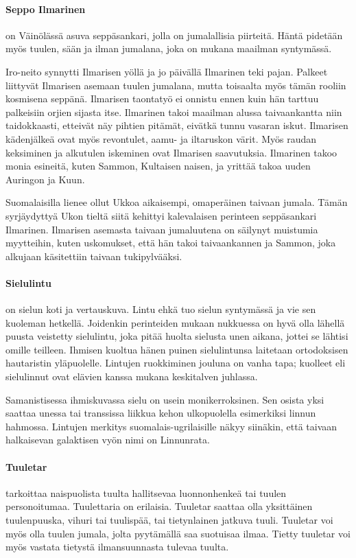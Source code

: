   \paragraph{Seppo Ilmarinen} on Väinölässä asuva seppäsankari, jolla on jumalallisia piirteitä.
    Häntä pidetään myös tuulen, sään ja ilman jumalana, joka on mukana maailman syntymässä. \par
    Iro-neito synnytti Ilmarisen yöllä ja jo päivällä Ilmarinen teki pajan. Palkeet liittyvät
    Ilmarisen asemaan tuulen jumalana, mutta toisaalta myös tämän rooliin kosmisena seppänä.
    Ilmarisen taontatyö ei onnistu ennen kuin hän tarttuu palkeisiin orjien sijasta itse.
    Ilmarinen takoi maailman alussa taivaankantta niin taidokkaasti, etteivät näy pihtien pitämät,
    eivätkä tunnu vasaran iskut. Ilmarisen kädenjälkeä ovat myös revontulet, aamu- ja iltaruskon
    värit. Myös raudan keksiminen ja alkutulen iskeminen ovat Ilmarisen saavutuksia. Ilmarinen
    takoo monia esineitä, kuten Sammon, Kultaisen naisen, ja yrittää takoa uuden Auringon ja Kuun.
    \par
    Suomalaisilla lienee ollut Ukkoa aikaisempi, omaperäinen taivaan jumala. Tämän syrjäydyttyä
    Ukon tieltä siitä kehittyi kalevalaisen perinteen seppäsankari Ilmarinen. Ilmarisen asemasta
    taivaan jumaluutena on säilynyt muistumia myytteihin, kuten uskomukset, että hän takoi
    taivaankannen ja Sammon, joka alkujaan käsitettiin taivaan tukipylvääksi.
  \paragraph{Sielulintu} on sielun koti ja vertauskuva. Lintu ehkä tuo sielun syntymässä ja vie sen
    kuoleman hetkellä. Joidenkin perinteiden mukaan nukkuessa on hyvä olla lähellä puusta
    veistetty sielulintu, joka pitää huolta sielusta unen aikana, jottei se lähtisi omille
    teilleen. Ihmisen kuoltua hänen puinen sielulintunsa laitetaan ortodoksisen hautaristin
    yläpuolelle. Lintujen ruokkiminen jouluna on vanha tapa; kuolleet eli sielulinnut ovat elävien
    kanssa mukana keskitalven juhlassa. \par
    Samanistisessa ihmiskuvassa sielu on usein monikerroksinen. Sen osista yksi saattaa unessa tai
    transsissa liikkua kehon ulkopuolella esimerkiksi linnun hahmossa. Lintujen merkitys
    suomalais-ugrilaisille näkyy siinäkin, että taivaan halkaisevan galaktisen vyön nimi on
    Linnunrata.
  \paragraph{Tuuletar} tarkoittaa naispuolista tuulta hallitsevaa luonnonhenkeä tai tuulen
    personoitumaa. Tuulettaria on erilaisia. Tuuletar saattaa olla yksittäinen tuulenpuuska,
    vihuri tai tuulispää, tai tietynlainen jatkuva tuuli. Tuuletar voi myös olla tuulen jumala,
    jolta pyytämällä saa suotuisaa ilmaa. Tietty tuuletar voi myös vastata tietystä ilmansuunnasta
    tulevaa tuulta.
